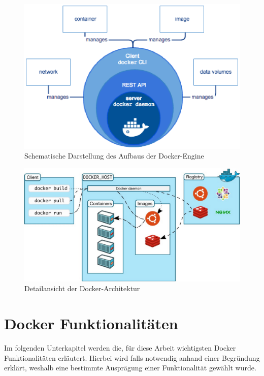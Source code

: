 \begin{figure}
	\centering
	\includegraphics[width=0.7\linewidth]{figures/DockerEngine}
	\caption[Aufbau Docker-Engine]{Schematische Darstellung des Aufbaus der Docker-Engine}
	\label{fig:dockerengine}
\end{figure}
\begin{figure}
	\centering
	\includegraphics[width=0.7\linewidth]{figures/DockerArchitecture}
	\caption[Detailansicht der Docker-Architektur]{Detailansicht der Docker-Architektur}
	\label{fig:dockerarchitecture}
\end{figure}
\section{Docker Funktionalitäten}
\label{c:funktionalität}
Im folgenden Unterkapitel werden die, für diese Arbeit wichtigsten Docker Funktionalitäten erläutert. Hierbei wird falls notwendig anhand einer Begründung erklärt, weshalb eine bestimmte Ausprägung einer Funktionalität gewählt wurde.
